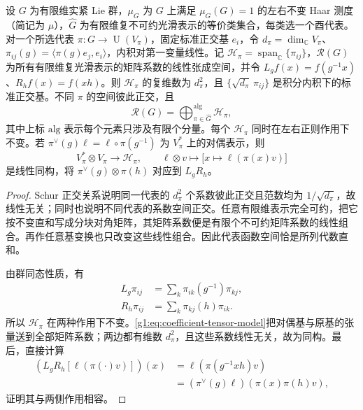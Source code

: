 \begin{proposition}\label{g1:prop:matrix-coefficient-biregular-model}
	设 \(G\) 为有限维实紧 Lie 群，\(\mu_G\) 为 \(G\) 上满足 \(\mu_G(G)=1\) 的左右不变 Haar 测度（简记为 \(\mu\)），\(\widehat G\) 为有限维复不可约光滑表示的等价类集合，每类选一个酉代表。对一个所选代表 \(\pi:G\to\operatorname{U}(V_\pi)\)，固定标准正交基 \(e_i\)，令 \(d_\pi=\dim_{\mathbb C}V_\pi\)、\(\pi_{ij}(g)=\langle\pi(g)e_j,e_i\rangle\)，内积对第一变量线性。记 \(\mathcal H_\pi=\operatorname{span}_{\mathbb C}\{\pi_{ij}\}\)，\(\mathcal R(G)\) 为所有有限维复光滑表示的矩阵系数的线性张成空间，并令 \(L_gf(x)=f(g^{-1}x)\)、\(R_hf(x)=f(xh)\)。则 \(\mathcal H_\pi\) 的复维数为 \(d_\pi^2\)，且 \(\{\sqrt{d_\pi}\,\pi_{ij}\}\) 是积分内积下的标准正交基。不同 \(\pi\) 的空间彼此正交，且
	\[
		\mathcal R(G)=\bigoplus_{\pi\in\widehat G}^{\mathrm{alg}}\mathcal H_\pi,
	\]
	其中上标 \(\mathrm{alg}\) 表示每个元素只涉及有限个分量。每个 \(\mathcal H_\pi\) 同时在左右正则作用下不变。若 \(\pi^\vee(g)\ell=\ell\circ\pi(g^{-1})\) 为 \(V_\pi^*\) 上的对偶表示，则
	\begin{equation}\label{g1:eq:coefficient-tensor-model}
		V_\pi^*\otimes V_\pi\longrightarrow\mathcal H_\pi,
		\qquad\ell\otimes v\longmapsto\bigl[x\mapsto\ell(\pi(x)v)\bigr]
	\end{equation}
	是线性同构，将 \(\pi^\vee(g)\otimes\pi(h)\) 对应到 \(L_gR_h\)。
\end{proposition}
\begin{proof}
	Schur 正交关系说明同一代表的 \(d_\pi^2\) 个系数彼此正交且范数均为 \(1/\sqrt{d_\pi}\)，故线性无关；同时也说明不同代表的系数空间正交。任意有限维表示完全可约，把它按不变直和写成分块对角矩阵，其矩阵系数便是有限个不可约矩阵系数的线性组合。再作任意基变换也只改变这些线性组合。因此代表函数空间恰是所列代数直和。

	由群同态性质，有
	\begin{equation}\label{g1:eq:left-right-matrix-coefficients}
		\begin{aligned}
			L_g\pi_{ij}&=\sum_k\pi_{ik}(g^{-1})\pi_{kj},\\
			R_h\pi_{ij}&=\sum_k\pi_{kj}(h)\pi_{ik}.
		\end{aligned}
	\end{equation}
	所以 \(\mathcal H_\pi\) 在两种作用下不变。\eqref{g1:eq:coefficient-tensor-model}把对偶基与原基的张量送到全部矩阵系数；两边都有维数 \(d_\pi^2\)，且这些系数线性无关，故为同构。最后，直接计算
	\[
		\begin{aligned}
			(L_gR_h[\ell(\pi(\cdot)v)])(x)
			&=\ell(\pi(g^{-1}xh)v)\\
			&=(\pi^\vee(g)\ell)(\pi(x)\pi(h)v),
		\end{aligned}
	\]
	证明其与两侧作用相容。
\end{proof}

